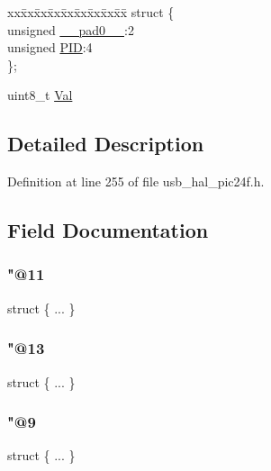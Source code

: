 \begin{DoxyCompactItemize}
\begin{tabbing}
\end{tabbing}\item 
\begin{tabbing}
xx\=xx\=xx\=xx\=xx\=xx\=xx\=xx\=xx\=\kill
struct \{\\
\>unsigned \mbox{\hyperlink{union___b_d___s_t_a_t_adf71f3d8410c1f1dbbc96680a92c49af}{\_\_pad0\_\_}}:2\\
\>unsigned \mbox{\hyperlink{union___b_d___s_t_a_t_a97b41b25e06fd7857dcc6217c160a8ad}{PID}}:4\\
\}; \\

\end{tabbing}\item 
uint8\+\_\+t \mbox{\hyperlink{union___b_d___s_t_a_t_aa0c179f4462bb12ca1ed40d18c89cda1}{Val}}
\end{DoxyCompactItemize}


\subsection{Detailed Description}


Definition at line 255 of file usb\+\_\+hal\+\_\+pic24f.\+h.



\subsection{Field Documentation}
\mbox{\label{union___b_d___s_t_a_t_aef5c890ba2a36d54f0507ff80291524a}} 
\subsubsection{\texorpdfstring{"@11}{@11}}
{\footnotesize\ttfamily struct \{ ... \} }

\mbox{\label{union___b_d___s_t_a_t_a4246cc01c82da684fad1cfc1a1a14507}} 
\subsubsection{\texorpdfstring{"@13}{@13}}
{\footnotesize\ttfamily struct \{ ... \} }

\mbox{\label{union___b_d___s_t_a_t_af56785e345b60be0307ce761e6f92983}} 
\subsubsection{\texorpdfstring{"@9}{@9}}
{\footnotesize\ttfamily struct \{ ... \} }

